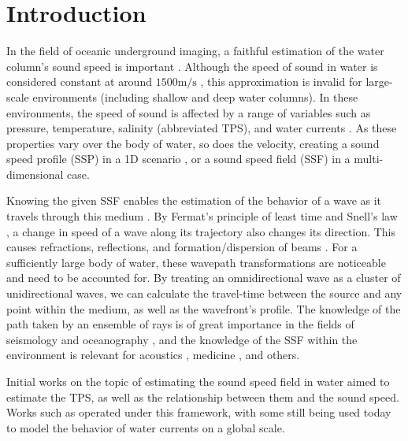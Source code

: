 \section{Introduction}

In the field of oceanic underground imaging, a faithful estimation of the water column's sound speed is important \cite{jensen_computational_2011,medwin_fundamentals_1999}. Although the speed of sound in water is considered constant at around $1500 \si{\meter}/\si{\second}$ \cite{delgrosso_new_1974}, this approximation is invalid for large-scale environments \cite{pinson_sound_2010} (including shallow and deep water columns). In these environments, the speed of sound is affected by a range of variables such as pressure, temperature, salinity (abbreviated TPS), and water currents \cite{medwin_fundamentals_1999,delgrosso_new_1974}. As these properties vary over the body of water, so does the velocity, creating a sound speed profile (SSP) in a 1D scenario \cite{li_acoustic_2019,pinson_sound_2010}, or a sound speed field (SSF) in a multi-dimensional case.

Knowing the given SSF enables the estimation of the behavior of a wave as it travels through this medium \cite{li_acoustic_2019,pinson_sound_2010}. By Fermat's principle of least time and Snell's law \cite{perrine_fermats_1961}, a change in speed of a wave along its trajectory also changes its direction. This causes refractions, reflections, and formation/dispersion of beams \cite{cornuelle_ocean_2008}. For a sufficiently large body of water, these wavepath transformations are noticeable and need to be accounted for. By treating an omnidirectional wave as a cluster of unidirectional waves, we can calculate the travel-time between the source and any point within the medium, as well as the wavefront's profile. The knowledge of the path taken by an ensemble of rays is of great importance in the fields of seismology \cite{bormann_seismic_2012} and oceanography \cite{cornuelle_ocean_2008}, and the knowledge of the SSF within the environment is relevant for acoustics \cite{holstein_acoustic_2004}, medicine \cite{hormati_robust_2010}, and others.

Initial works on the topic of estimating the sound speed field in water aimed to estimate the TPS, as well as the relationship between them and the sound speed. Works such as \cite{medwin_fundamentals_1999,mcdougall_getting_2011,delgrosso_new_1974} operated under this framework, with some still being used today to model the behavior of water currents on a global scale.


